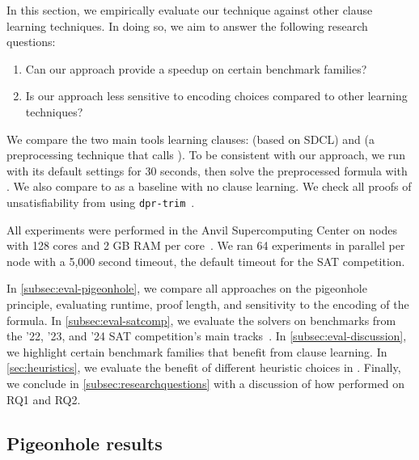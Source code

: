 In this section, we empirically evaluate our technique against other \pr clause
learning techniques. In doing so, we aim to answer the following research
questions:


\begin{enumerate}[label={RQ\arabic*}]
    \item Can our approach provide a speedup on certain benchmark families?
    \item Is our approach less sensitive to encoding choices compared to other
    \pr learning techniques?
\end{enumerate}


We compare the two main tools learning \pr clauses: \sadical (based on SDCL) and
\prelearn (a preprocessing technique that calls \sadical). To be consistent with
our approach, we run \prelearn with its default settings for 30 seconds, then
solve the preprocessed formula with \cadical. We also compare to \cadical as a
baseline with no \pr clause learning. We check all proofs of unsatisfiability
from \tool using \texttt{dpr-trim}~\cite{dpr-trim}.

All experiments were performed in the Anvil Supercomputing Center on nodes with
128 cores and 2 GB RAM per core~\cite{anvil}. We ran 64 experiments in parallel
per node with a 5,000 second timeout, the default timeout for the SAT
competition.

In \autoref{subsec:eval-pigeonhole}, we compare all approaches on the pigeonhole
principle, evaluating runtime, proof length, and sensitivity to the encoding of
the formula. In \autoref{subsec:eval-satcomp}, we evaluate the solvers on
benchmarks from the '22, '23, and '24 SAT competition's main
tracks~\cite{satcomp2022,satcomp2023,satcomp2024}. In
\autoref{subsec:eval-discussion}, we highlight certain benchmark families that
benefit from \pr clause learning. In \autoref{sec:heuristics}, we evaluate the 
benefit of different heuristic choices in \tool. Finally, we conclude in 
\autoref{subsec:researchquestions} with a discussion of how performed on RQ1 and 
RQ2.



\subsection{Pigeonhole results}~\label{subsec:eval-pigeonhole}


